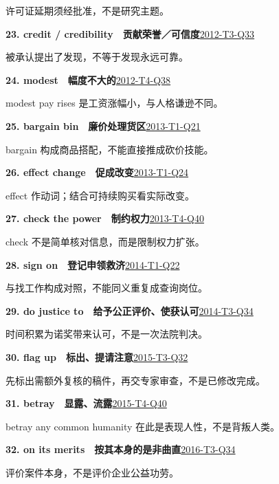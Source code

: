 \documentclass[11pt,a4paper]{article}
\begin{document}
许可证延期须经批准，不是研究主题。\par
{}\noindent\textbf{23. credit / credibility　贡献荣誉／可信度}\hfill \hyperref[idx-2012-T3-Q33]{2012-T3-Q33}\par
被承认提出了发现，不等于发现永远可靠。\par
{}\noindent\textbf{24. modest　幅度不大的}\hfill \hyperref[idx-2012-T4-Q38]{2012-T4-Q38}\par
modest pay rises 是工资涨幅小，与人格谦逊不同。\par
{}\noindent\textbf{25. bargain bin　廉价处理货区}\hfill \hyperref[idx-2013-T1-Q21]{2013-T1-Q21}\par
bargain 构成商品搭配，不能直接推成砍价技能。\par
{}\noindent\textbf{26. effect change　促成改变}\hfill \hyperref[idx-2013-T1-Q24]{2013-T1-Q24}\par
effect 作动词；结合可持续购买看实际改变。\par
{}\noindent\textbf{27. check the power　制约权力}\hfill \hyperref[idx-2013-T4-Q40]{2013-T4-Q40}\par
check 不是简单核对信息，而是限制权力扩张。\par
{}\noindent\textbf{28. sign on　登记申领救济}\hfill \hyperref[idx-2014-T1-Q22]{2014-T1-Q22}\par
与找工作构成对照，不能同义重复成查询岗位。\par
{}\noindent\textbf{29. do justice to　给予公正评价、使获认可}\hfill \hyperref[idx-2014-T3-Q34]{2014-T3-Q34}\par
时间积累为诺奖带来认可，不是一次法院判决。\par
{}\noindent\textbf{30. flag up　标出、提请注意}\hfill \hyperref[idx-2015-T3-Q32]{2015-T3-Q32}\par
先标出需额外复核的稿件，再交专家审查，不是已修改完成。\par
{}\noindent\textbf{31. betray　显露、流露}\hfill \hyperref[idx-2015-T4-Q40]{2015-T4-Q40}\par
betray any common humanity 在此是表现人性，不是背叛人类。\par
{}\noindent\textbf{32. on its merits　按其本身的是非曲直}\hfill \hyperref[idx-2016-T3-Q34]{2016-T3-Q34}\par
评价案件本身，不是评价企业公益功劳。\par
\end{document}
